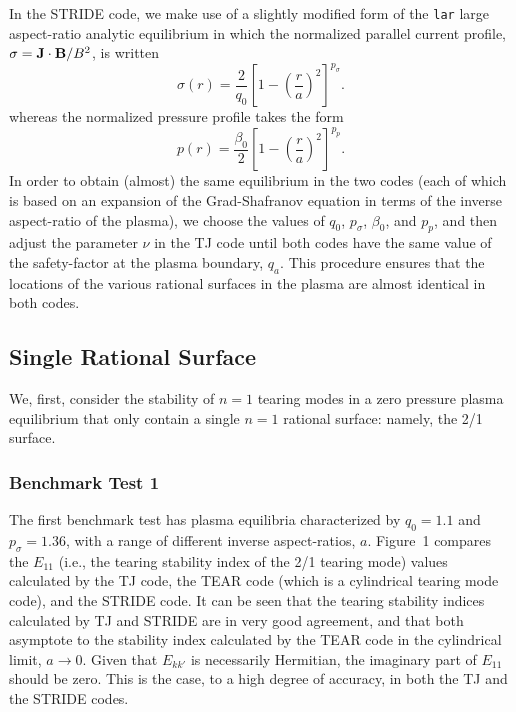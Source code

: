 \documentclass[12pt,prb,aps]{revtex4-1}
\begin{document}
In the  STRIDE code, we make use of a slightly modified form of the \verb|lar| large aspect-ratio analytic equilibrium in which the 
 normalized parallel current profile, $\sigma={\bf J}\cdot{\bf B}/B^2$,  is written
\begin{equation}
\sigma(r) = \frac{2}{q_0}\left[1-\left(\frac{r}{a}\right)^2\right]^{p_\sigma}.
\end{equation}
whereas the  normalized pressure profile takes the form
\begin{equation}
p(r)= \frac{\beta_0}{2}\left[1-\left(\frac{r}{a}\right)^2\right]^{p_p}.
\end{equation}
In order to obtain (almost) the same equilibrium in the two codes (each of which is based on an expansion of the Grad-Shafranov equation in terms of the inverse aspect-ratio of the plasma), we choose the values of $q_0$, $p_\sigma$, $\beta_0$, and $p_p$, and then
adjust the parameter $\nu$ in the TJ code until both codes have the same value of the safety-factor at the plasma boundary, $q_a$. This procedure ensures that the locations of the various rational surfaces in the plasma are
almost identical in both codes. 

\subsection{Single Rational Surface}
We, first,  consider the stability of $n=1$ tearing modes 
in a zero pressure plasma equilibrium that only contain a single $n=1$ rational surface: namely, the 2/1 surface. 

\subsubsection{Benchmark Test 1}
The first benchmark  test has plasma equilibria characterized by $q_0=1.1$ and $p_\sigma=1.36$, with a range of different inverse aspect-ratios, $a$. 
Figure~1 compares the $E_{11}$ (i.e.,
the tearing stability index of the 2/1 tearing mode) values calculated by the TJ code,\cite{tj} the TEAR code (which is a cylindrical tearing mode code), and
the STRIDE code. It can be seen that the tearing stability indices calculated by  TJ and STRIDE are in very good agreement, and that both asymptote to the stability index calculated by the TEAR code
in the cylindrical limit, $a\rightarrow 0$. Given that  $E_{kk'}$ is necessarily Hermitian,\cite{tj} the imaginary part of $E_{11}$ should be zero. This is the case, to a high
degree of accuracy, in both the TJ and the STRIDE codes. 
\end{document}
